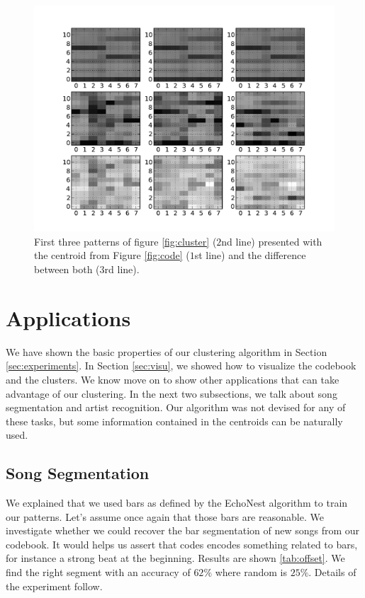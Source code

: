 \documentclass{article}
\begin{document}
\begin{figure}[htb]
\begin{center}
\includegraphics[width=.8\columnwidth]{close_patterns_diff}
\end{center}
\caption{\small{First three patterns of figure \ref{fig:cluster}
($2$nd line) presented with the centroid from Figure \ref{fig:code}
($1$st line) and the difference between both ($3$rd line).
}}
\label{fig:cluster_diff}
\end{figure}



\section{Applications}\label{sec:exps2}
We have shown the basic properties of our clustering algorithm in
Section \ref{sec:experiments}. In Section \ref{sec:visu}, we showed
how to visualize the codebook and the clusters. We know move on to
show other applications that can take advantage of our clustering.
In the next two subsections, we talk about song segmentation and
artist recognition. Our algorithm was not devised for any of these tasks,
but some information contained in the centroids can be naturally used.

\subsection{Song Segmentation}
We explained that we used bars as defined by the EchoNest algorithm to
train our patterns. Let's assume once again that those bars are
reasonable. We investigate whether we could recover the bar segmentation
of new songs from our codebook. It would helps us assert that codes
encodes something related to bars, for instance a strong beat at the
beginning. Results are shown \ref{tab:offset}. We find the right segment
with an accuracy of $62\%$ where random is $25\%$. Details of the
experiment follow.
\end{document}
